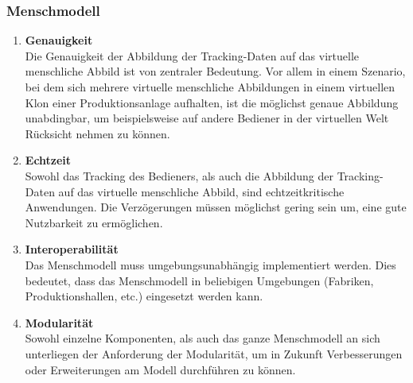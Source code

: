 \subsubsection{Menschmodell}\label{sec:AnforderungenMensch}
\begin{enumerate}
	\item \textbf{Genauigkeit} \\
	Die Genauigkeit der Abbildung der Tracking-Daten auf das virtuelle menschliche Abbild ist von zentraler Bedeutung. Vor allem in einem Szenario, bei dem sich mehrere virtuelle menschliche Abbildungen in einem virtuellen Klon einer Produktionsanlage aufhalten, ist die möglichst genaue Abbildung unabdingbar, um beispielsweise auf andere Bediener in der virtuellen Welt Rücksicht nehmen zu können.
	\item \textbf{Echtzeit} \\
	Sowohl das Tracking des Bedieners, als auch die Abbildung der Tracking-Daten auf das virtuelle menschliche Abbild, sind echtzeitkritische Anwendungen. Die Verzögerungen müssen möglichst gering sein um, eine gute Nutzbarkeit zu ermöglichen.
	\item \textbf{Interoperabilität} \\
	Das Menschmodell muss umgebungsunabhängig implementiert werden. Dies bedeutet, dass das Menschmodell in beliebigen Umgebungen (Fabriken, Produktionshallen, etc.) eingesetzt werden kann.
	\item \textbf{Modularität} \\
	Sowohl einzelne Komponenten, als auch das ganze Menschmodell an sich unterliegen der Anforderung der Modularität, um in Zukunft Verbesserungen oder Erweiterungen am Modell durchführen zu können.
\end{enumerate}


